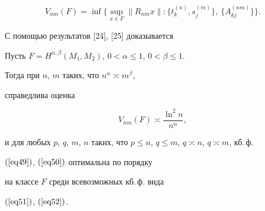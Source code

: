 $$


V_{nm}(F) = \inf\{\sup_{x\in F}


\|R_{nm}x\|:\{t_k^{(n)},s_j^{(m)}\},


\ \{A_{kj}^{(nm)}\}\}.


$$





С помощью результатов [24], [25] доказывается








\begin{thm}\label{th9}


Пусть $F=H^{\alpha,\beta}(M_1,M_2)$, $0<\alpha\leq1$, $0<\beta\leq1$.


Тогда при $n$, $m$ таких, что $n^\alpha\asymp m^\beta$,


справедлива оценка


$$


V_{nm}(F)\asymp\frac{\ln^2n}{n^\alpha},


$$


и для любых $p$, $q$, $m$, $n$ таких, что $p\leq n$, $q\leq


m$, $q\asymp n$, $q\asymp m$, кб.\,ф.


$(\ref{eq49})$, $(\ref{eq50})$ оптимальна по порядку


на классе $F$ среди всевозможных кб.\,ф. вида


$(\ref{eq51})$, $(\ref{eq52})$.


\end{thm}








